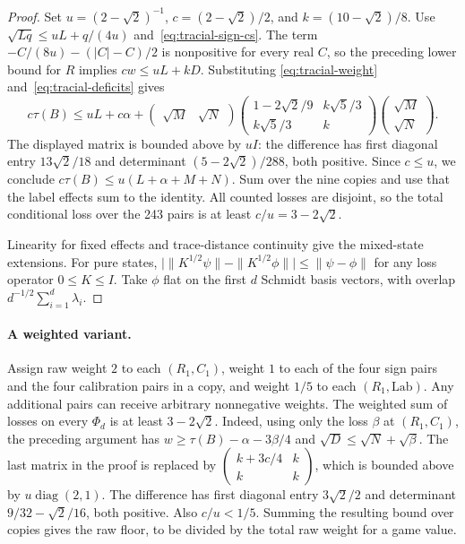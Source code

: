 \begin{proof}
Set $u=(2-\sqrt2)^{-1}$, $c=(2-\sqrt2)/2$, and $k=(10-\sqrt2)/8$.
Use $\sqrt{Lq}\le uL+q/(4u)$ and~\eqref{eq:tracial-sign-cs}. The term
$-C/(8u)-(|C|-C)/2$ is nonpositive for every real $C$, so the preceding
lower bound for $R$ implies $cw\le uL+kD$. Substituting
\eqref{eq:tracial-weight} and~\eqref{eq:tracial-deficits} gives
\[
 c\tau(B)\le uL+c\alpha+
   \begin{pmatrix}\sqrt M&\sqrt N\end{pmatrix}
   \begin{pmatrix}1-2\sqrt2/9 & k\sqrt5/3\\ k\sqrt5/3&k\end{pmatrix}
   \begin{pmatrix}\sqrt M\\\sqrt N\end{pmatrix}.
\]
The displayed matrix is bounded above by $uI$: the difference has first
diagonal entry $13\sqrt2/18$ and determinant $(5-2\sqrt2)/288$, both
positive. Since $c\le u$, we conclude $c\tau(B)\le u(L+\alpha+M+N)$.
Sum over the nine copies and use that the label effects sum to the identity.
All counted losses are disjoint, so the total conditional loss over the
243 pairs is at least $c/u=3-2\sqrt2$.

Linearity for fixed effects and trace-distance continuity give the mixed-state
extensions. For pure states, $\big|\|K^{1/2}\psi\|-\|K^{1/2}\phi\|\big|\le
\|\psi-\phi\|$ for any loss operator $0\le K\le I$. Take $\phi$ flat on the
first $d$ Schmidt basis vectors, with overlap $d^{-1/2}\sum_{i=1}^d\lambda_i$.
\end{proof}

\paragraph{A weighted variant.}
Assign raw weight $2$ to each $(R_1,C_1)$, weight $1$ to each of the four
sign pairs and the four calibration pairs in a copy, and weight $1/5$ to
each $(R_1,\mathrm{Lab})$. Any additional pairs can receive arbitrary
nonnegative weights. The weighted sum of losses on every $\Phi_d$ is at
least $3-2\sqrt2$. Indeed, using only the loss $\beta$ at $(R_1,C_1)$,
the preceding argument has $w\ge\tau(B)-\alpha-3\beta/4$ and
$\sqrt D\le\sqrt N+\sqrt\beta$. The last matrix in the proof is replaced
by $\left(\begin{smallmatrix} k+3c/4&k\\k&k\end{smallmatrix}\right)$,
which is bounded above by $u\operatorname{diag}(2,1)$. The difference
has first diagonal entry $3\sqrt2/2$ and determinant $9/32-\sqrt2/16$,
both positive. Also $c/u<1/5$. Summing the resulting bound over copies
gives the raw floor, to be divided by the total raw weight for a game value.

